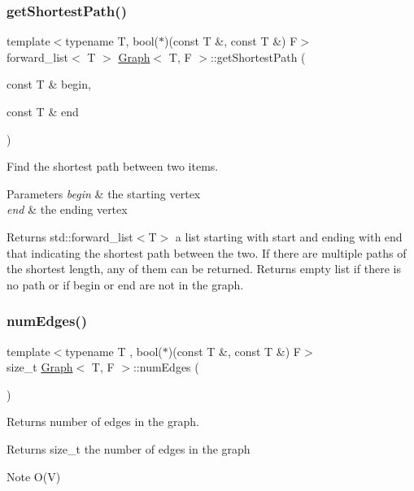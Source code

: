 \subsubsection{\texorpdfstring{get\+Shortest\+Path()}{getShortestPath()}}
{\footnotesize\ttfamily template$<$typename T, bool($\ast$)(const T \&, const T \&) F$>$ \\
forward\+\_\+list$<$ T $>$ \hyperlink{class_graph}{Graph}$<$ T, F $>$\+::get\+Shortest\+Path (\begin{DoxyParamCaption}\item[{const T \&}]{begin,  }\item[{const T \&}]{end }\end{DoxyParamCaption})}



Find the shortest path between two items. 


\begin{DoxyParams}{Parameters}
{\em begin} & the starting vertex \\
\hline
{\em end} & the ending vertex \\
\hline
\end{DoxyParams}
\begin{DoxyReturn}{Returns}
std\+::forward\+\_\+list$<$\+T$>$ a list starting with start and ending with end that indicating the shortest path between the two. If there are multiple paths of the shortest length, any of them can be returned. Returns empty list if there is no path or if begin or end are not in the graph. 
\end{DoxyReturn}
\mbox{\label{class_graph_a5548064ddb3dfa56bb32347ee47f98dd}} 
\subsubsection{\texorpdfstring{num\+Edges()}{numEdges()}}
{\footnotesize\ttfamily template$<$typename T , bool($\ast$)(const T \&, const T \&) F$>$ \\
size\+\_\+t \hyperlink{class_graph}{Graph}$<$ T, F $>$\+::num\+Edges (\begin{DoxyParamCaption}{ }\end{DoxyParamCaption})}



Returns number of edges in the graph. 

\begin{DoxyReturn}{Returns}
size\+\_\+t the number of edges in the graph
\end{DoxyReturn}
\begin{DoxyNote}{Note}
O(\+V) 
\end{DoxyNote}
\mbox{\label{class_graph_afec0f8270f77a9b54f6528a4e7182c84}} 
